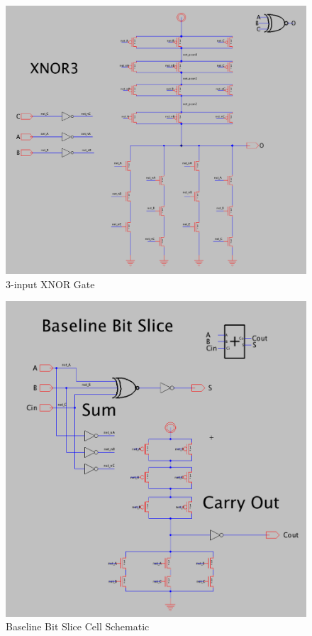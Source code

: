 \documentclass{article}
\begin{document}
\begin{figure}[H]
  \includegraphics[width=\linewidth]{baseline_screenshots/XNOR3.png}
  \caption{3-input XNOR Gate}
  \label{fig:3inputnor}
\end{figure}

\begin{figure}[H]
  \includegraphics[width=\linewidth]{baseline_screenshots/baseline.png}
  \caption{Baseline Bit Slice Cell Schematic}
  \label{fig:baselinesch}
\end{figure}
\pagebreak
\end{document}
